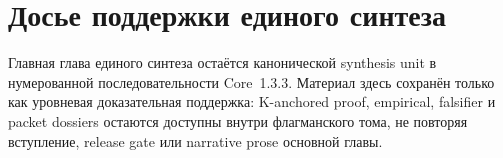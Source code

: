 \section{Досье поддержки единого синтеза}
\label{sec:oc-core-1-3-synthesis-support-dossiers}

Главная глава единого синтеза остаётся канонической synthesis unit в
нумерованной последовательности Core~1.3.3. Материал здесь сохранён только как
уровневая доказательная поддержка: K-anchored proof, empirical, falsifier и
packet dossiers остаются доступны внутри флагманского тома, не повторяя
вступление, release gate или narrative prose основной главы.


